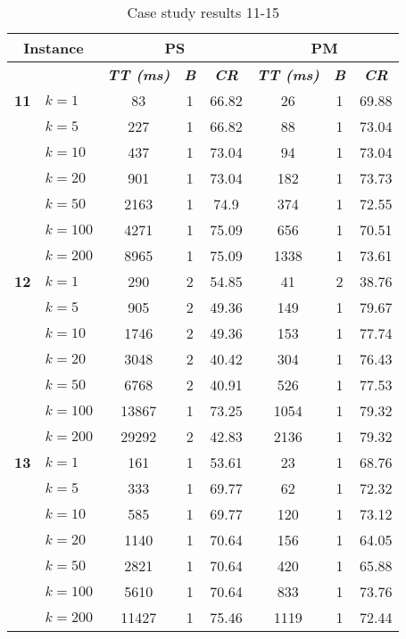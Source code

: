     \begin{table}[htbp]
    \caption{Case study results 11-15}
    \centering
    \begin{tabular}{|l|l|c|c|c|c|c|c|}
    \hline
    \multicolumn{ 2}{|c|}{\textbf{Instance}} & \multicolumn{ 3}{c|}{\textbf{PS}} & \multicolumn{ 3}{c|}{\textbf{PM}} \\ \hline
    \multicolumn{ 2}{|l|}{} & \textbf{\textit{TT (ms)}} & \textbf{\textit{B}} & \textbf{\textit{CR}} & \textbf{\textit{TT (ms)}} & \textbf{\textit{B}} & \textbf{\textit{CR}} \\ \hline
    \multicolumn{1}{|r|}{\textbf{11}} & $k=1$ & 83 & 1 & 66.82 & 26 & 1 & 69.88 \\ 
     & $k=5$ & 227 & 1 & 66.82 & 88 & 1 & 73.04 \\ 
     & $k=10$ & 437 & 1 & 73.04 & 94 & 1 & 73.04 \\ 
     & $k=20$ & 901 & 1 & 73.04 & 182 & 1 & 73.73 \\ 
     & $k=50$ & 2163 & 1 & 74.9 & 374 & 1 & 72.55 \\ 
     & $k=100$ & 4271 & 1 & 75.09 & 656 & 1 & 70.51 \\ 
     & $k=200$ & 8965 & 1 & 75.09 & 1338 & 1 & 73.61 \\ \hline
    \multicolumn{1}{|r|}{\textbf{12}} & $k=1$ & 290 & 2 & 54.85 & 41 & 2 & 38.76 \\ 
     & $k=5$ & 905 & 2 & 49.36 & 149 & 1 & 79.67 \\ 
     & $k=10$ & 1746 & 2 & 49.36 & 153 & 1 & 77.74 \\ 
     & $k=20$ & 3048 & 2 & 40.42 & 304 & 1 & 76.43 \\ 
     & $k=50$ & 6768 & 2 & 40.91 & 526 & 1 & 77.53 \\ 
     & $k=100$ & 13867 & 1 & 73.25 & 1054 & 1 & 79.32 \\ 
     & $k=200$ & 29292 & 2 & 42.83 & 2136 & 1 & 79.32 \\ \hline
    \multicolumn{1}{|r|}{\textbf{13}} & $k=1$ & 161 & 1 & 53.61 & 23 & 1 & 68.76 \\ 
     & $k=5$ & 333 & 1 & 69.77 & 62 & 1 & 72.32 \\ 
     & $k=10$ & 585 & 1 & 69.77 & 120 & 1 & 73.12 \\ 
     & $k=20$ & 1140 & 1 & 70.64 & 156 & 1 & 64.05 \\ 
     & $k=50$ & 2821 & 1 & 70.64 & 420 & 1 & 65.88 \\ 
     & $k=100$ & 5610 & 1 & 70.64 & 833 & 1 & 73.76 \\ 
     & $k=200$ & 11427 & 1 & 75.46 & 1119 & 1 & 72.44 \\ \hline

\end{tabular}
\end{table}
